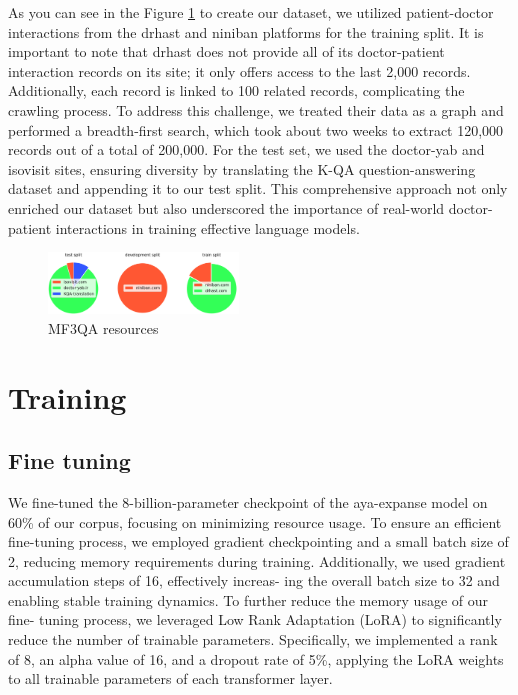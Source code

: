 \documentclass[conference]{IEEEtran}
\begin{document}
	As you can see in the Figure
	\ref{fig2}
	to create our dataset, we utilized patient-doctor interactions from the drhast and niniban platforms for the training split. It is important to note that drhast does not provide all of its doctor-patient interaction records on its site; it only offers access to the last 2,000 records. Additionally, each record is linked to 100 related records, complicating the crawling process. To address this challenge, we treated their data as a graph and performed a breadth-first search, which took about two weeks to extract 120,000 records out of a total of 200,000. For the test set, we used the doctor-yab and isovisit sites, ensuring diversity by translating the K-QA question-answering dataset
	\cite{b27}
	and appending it to our test split. This comprehensive approach not only enriched our dataset but also underscored the importance of real-world doctor-patient interactions in training effective language models.
	
	\begin{figure}[htbp]
		\centerline{\includegraphics[width=0.45\textwidth]{fig2.png}}
		\caption{MF3QA resources}
		\label{fig2}
	\end{figure}
	
	\section{Training}
	\subsection{Fine tuning}
	We fine-tuned the 8-billion-parameter checkpoint of the aya-expanse model on 60\% of our corpus, focusing on minimizing
	resource usage. To ensure an efficient fine-tuning process, we
	employed gradient checkpointing and a small batch size of 2,
	reducing memory requirements during training. Additionally,
	we used gradient accumulation steps of 16, effectively increas-
	ing the overall batch size to 32 and enabling stable training
	dynamics. To further reduce the memory usage of our fine-
	tuning process, we leveraged Low Rank Adaptation (LoRA)
	\cite{b28}
	to significantly reduce the number of trainable parameters.
	Specifically, we implemented a rank of 8, an alpha value of
	16, and a dropout rate of 5\%, applying the LoRA weights to
	all trainable parameters of each transformer layer.
	
\end{document}
